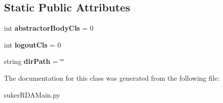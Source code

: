 \subsection*{Static Public Attributes}
\begin{DoxyCompactItemize}
\item 
\hypertarget{classsuker_r_d_a_1_1rda_pkg_1_1suker_r_d_a_main_1_1_abstractor_shell_a7ec1a696336313b5b3234ff0d481af8d}{int {\bfseries abstractor\+Body\+Cls} = 0}\label{classsuker_r_d_a_1_1rda_pkg_1_1suker_r_d_a_main_1_1_abstractor_shell_a7ec1a696336313b5b3234ff0d481af8d}

\item 
\hypertarget{classsuker_r_d_a_1_1rda_pkg_1_1suker_r_d_a_main_1_1_abstractor_shell_ac8e935bd498b6656b2c8b75e2bc6c0ee}{int {\bfseries logout\+Cls} = 0}\label{classsuker_r_d_a_1_1rda_pkg_1_1suker_r_d_a_main_1_1_abstractor_shell_ac8e935bd498b6656b2c8b75e2bc6c0ee}

\item 
\hypertarget{classsuker_r_d_a_1_1rda_pkg_1_1suker_r_d_a_main_1_1_abstractor_shell_acd01df8fa12904ff3dfa81c88df602ad}{string {\bfseries dir\+Path} = \char`\"{}\char`\"{}}\label{classsuker_r_d_a_1_1rda_pkg_1_1suker_r_d_a_main_1_1_abstractor_shell_acd01df8fa12904ff3dfa81c88df602ad}

\end{DoxyCompactItemize}


The documentation for this class was generated from the following file\+:\begin{DoxyCompactItemize}
\item 
suker\+R\+D\+A\+Main.\+py\end{DoxyCompactItemize}
